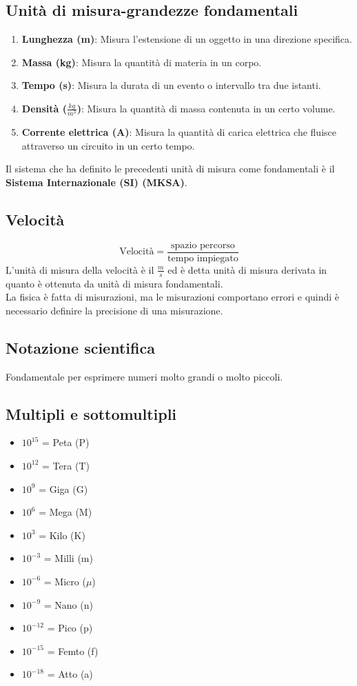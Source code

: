 \documentclass[../../main.tex]{subfiles}
\begin{document}
\subsection{Unità di misura-grandezze fondamentali}
\begin{enumerate}
    \item \textbf{Lunghezza (m)}: Misura l'estensione di un oggetto in una direzione specifica.
    \item \textbf{Massa (kg)}: Misura la quantità di materia in un corpo.
    \item \textbf{Tempo (s)}: Misura la durata di un evento o intervallo tra due istanti.
    \item \textbf{Densità ($\frac{kg}{m^3}$)}: Misura la quantità di massa contenuta in un certo volume.
    \item \textbf{Corrente elettrica (A)}: Misura la quantità di carica elettrica che fluisce attraverso un circuito in un certo tempo.
\end{enumerate}
Il sistema che ha definito le precedenti unità di misura come fondamentali è il \textbf{Sistema Internazionale (SI) (MKSA)}.
\subsection{Velocità}
\[
    \text{Velocità} = \frac{\text{spazio percorso}}{\text{tempo impiegato}}
\]
L'unità di misura della velocità è il $\frac{m}{s}$ ed è detta unità di misura derivata in quanto è ottenuta da unità di misura fondamentali.\\
La fisica è fatta di misurazioni, ma le misurazioni comportano errori e quindi è necessario definire la precisione di una misurazione.\\
\subsection{Notazione scientifica}
Fondamentale per esprimere numeri molto grandi o molto piccoli.
\subsection{Multipli e sottomultipli}
\begin{itemize}
    \item $10^15$ = Peta (P)
    \item $10^12$ = Tera (T)
    \item $10^9$ = Giga (G)
    \item $10^6$ = Mega (M)
    \item $10^3$ = Kilo (K)
    \item $10^{-3}$ = Milli (m)
    \item $10^{-6}$ = Micro ($\mu$)
    \item $10^{-9}$ = Nano (n)
    \item $10^{-12}$ = Pico (p)
    \item $10^{-15}$ = Femto (f)
    \item $10^{-18}$ = Atto (a)
\end{itemize}
\newpage
\end{document}
